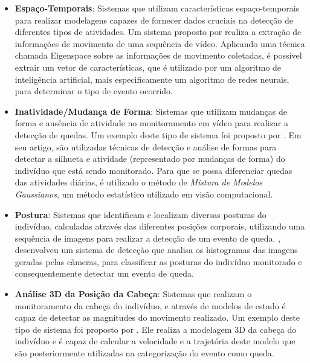 \begin{itemize}
	\item{\textbf{Espaço-Temporais}: Sistemas que utilizam características espaço-temporais para realizar modelagens capazes de fornecer dados cruciais na detecção de diferentes tipos de atividades.  Um sistema proposto por \cite{foroughi2008eigenspace} realiza a extração de informações de movimento de uma sequência de vídeo. Aplicando uma técnica chamada Eigenspace sobre as informações de movimento coletadas, é possível extrair um vetor de características, que  é utilizado por um algoritmo de inteligência artificial, mais especificamente um algoritmo de redes neurais, para determinar o tipo de evento ocorrido. }
	
	\item{\textbf{Inatividade/Mudança de Forma}: Sistemas que utilizam mudanças de forma e ausência de atividade no monitoramento em vídeo para realizar a detecção de quedas. Um exemplo deste tipo de sistema foi proposto por \cite{rougier2011robust}. Em seu artigo, são utilizadas técnicas de detecção e análise de formas para detectar a silhueta e atividade (representado por mudanças de forma) do indivíduo que está sendo monitorado. Para que se possa diferenciar quedas das atividades diárias, é utilizado o método de \textit{Mistura de Modelos Gaussianos}, um método estatístico utilizado em visão computacional.}
	
	\item{\textbf{Postura}: Sistemas que identificam e localizam diversas posturas do indivíduo, calculadas através das diferentes posições corporais, utilizando uma sequência de imagens para realizar a detecção de um evento de queda. \cite{cucchiara2005probabilistic}, desenvolveu um sistema de detecção que analisa os histogramas das imagens geradas pelas câmeras, para classificar as posturas do indivíduo monitorado e consequentemente detectar um evento de queda.  }
	
	\item{\textbf{Análise 3D da Posição da Cabeça}: Sistemas que realizam o monitoramento da cabeça do indivíduo, e através de modelos de estado é capaz de detectar as magnitudes do movimento realizado. Um exemplo deste tipo de sistema foi proposto por \cite{rougier2005demo}. Ele realiza a modelagem 3D da cabeça do indivíduo e é capaz de calcular a velocidade e a trajetória deste modelo que são posteriormente utilizadas na categorização do evento como queda.}	
\end{itemize}



